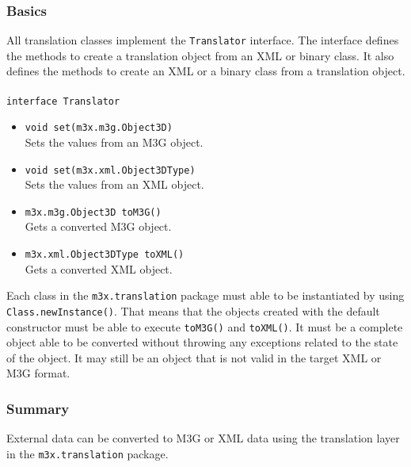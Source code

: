 \subsubsection{Basics}
All translation classes implement the \texttt{Translator} interface. The interface defines the methods to create a translation object from an XML or binary class. It also defines the methods to create an XML or a binary class from a translation object.
\\\\
\texttt{interface Translator}
\begin{itemize}
\item \texttt{void set(m3x.m3g.Object3D)}\\Sets the values from an M3G object.
\item \texttt{void set(m3x.xml.Object3DType)}\\Sets the values from an XML object.
\item \texttt{m3x.m3g.Object3D toM3G()}\\Gets a converted M3G object.
\item \texttt{m3x.xml.Object3DType toXML()}\\Gets a converted XML object.
\end{itemize}


Each class in the \texttt{m3x.translation} package must able to be instantiated by using \texttt{Class.newInstance()}. That means that the objects created with the default constructor must be able to execute \texttt{toM3G()} and \texttt{toXML()}. It must be a complete object able to be converted without throwing any exceptions related to the state of the object. It may still be an object that is not valid in the target XML or M3G format.


\subsubsection{Summary}
External data can be converted to M3G or XML data using the translation layer in the \texttt{m3x.translation} package.


